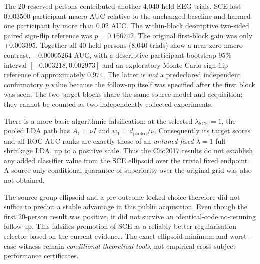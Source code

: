 The 20 reserved persons contributed another 4,040 held EEG
trials. SCE lost $0.003500$ participant-macro AUC relative
to the unchanged baseline and harmed one participant by
more than $0.02$ AUC. The within-block descriptive
two-sided paired sign-flip reference was $p=0.166742$.
The original first-block gain was only $+0.003395$.
Together all 40 held persons (8,040 trials) show
a near-zero macro contrast, $-0.00005264$ AUC,
with a descriptive participant-bootstrap 95\% interval
$[-0.003218,0.002973]$ and an exploratory
Monte Carlo sign-flip reference of approximately $0.974$.
The latter is \emph{not} a predeclared independent
confirmatory $p$ value because the follow-up itself was
specified after the first block was seen.
The two target blocks share the same source model and
acquisition; they cannot be counted as two independently
collected experiments.

There is a more basic algorithmic falsification: at the
selected $\lambda_{\mathrm{SCE}}=1$, the pooled LDA path has
$A_1=\nu I$ and $w_1=d_{\mathrm{pooled}}/\nu$.
Consequently its target scores and all ROC-AUC ranks
are exactly those of an \emph{untuned fixed
$\lambda=1$} full-shrinkage LDA, up to a positive
scale. Thus the Cho2017 results do not establish
any added classifier value from the SCE ellipsoid
over the trivial fixed endpoint. A source-only
conditional guarantee of superiority over the
original grid was also not obtained.

The source-group ellipsoid and a pre-outcome locked
choice therefore did not suffice to predict a stable
advantage in this public acquisition. Even though the
first 20-person result was positive, it did not survive
an identical-code no-retuning follow-up. This falsifies
promotion of SCE as a reliably better regularisation
selector based on the current evidence. The exact
ellipsoid minimum and worst-case witness remain
\emph{conditional theoretical tools}, not empirical
cross-subject performance certificates.
